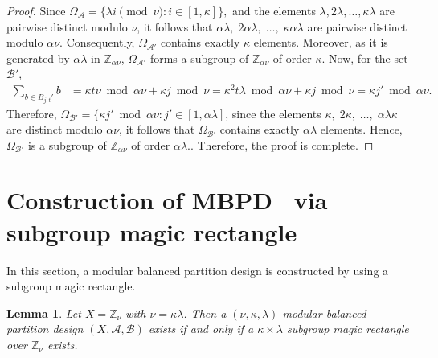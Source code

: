 \documentclass[preprint,11pt]{elsarticle}
\newcommand{\MBPD}{\textnormal{MBPD}}
\newtheorem{lemma}[theorem]{Lemma}
\begin{document}
\begin{proof}
\)
Since
\(
\Omega_{\mathcal{A}}
=
\{\lambda i \pmod{\nu}: i\in[1,\kappa]\},
\)
and the elements \(\lambda,2\lambda,\ldots,\kappa\lambda\) are pairwise distinct modulo \(\nu\), it follows that
\(
\alpha\lambda,\;2\alpha\lambda,\;\ldots,\;\kappa\alpha\lambda
\)
are pairwise distinct modulo \(\alpha\nu\). Consequently,
\(\Omega_{\mathcal{A}'}\) contains exactly \(\kappa\) elements. Moreover, as it is generated by \(\alpha\lambda\) in \(\mathbb{Z}_{\alpha\nu}\), \(\Omega_{\mathcal{A}'}\) forms a subgroup of \(\mathbb{Z}_{\alpha\nu}\) of order \(\kappa\). Now, for the set $\mathcal{B}',$
\begin{align*}
    \sum_{b\in B_{j,t}'}b& = \kappa t \nu \bmod{\alpha\nu}+\kappa j\bmod{\nu} = \kappa^2t{\lambda} \bmod{\alpha\nu}+\kappa j \bmod{\nu} = \kappa j'\bmod\alpha{\nu}.
\end{align*} Therefore, $\Omega_{\mathcal{B}'}=\{\kappa j'\bmod\alpha{\nu}:j'\in[1, \alpha\lambda]$, since the elements
\(
\kappa,\;2\kappa,\;\ldots,\;\alpha\lambda\kappa
\)
are distinct modulo \(\alpha\nu\), it follows that \(\Omega_{\mathcal{B}'}\) contains exactly \(\alpha\lambda\) elements. Hence, \(\Omega_{\mathcal{B}'}\) is a subgroup of \(\mathbb{Z}_{\alpha\nu}\) of order \(\alpha\lambda\)..  Therefore, the proof is complete. 
\end{proof}

\section{Construction of \MBPD~ via subgroup magic rectangle}
In this section, a modular balanced partition design is constructed by using a subgroup magic rectangle.
\begin{lemma}\label{lemmamain}
Let $X=\mathbb{Z}_\nu$ with $\nu=\kappa\lambda$. 
Then a $(\nu,\kappa,\lambda)$-modular balanced partition design 
$(X,\mathcal{A},\mathcal{B})$ exists if and only if  
a $\kappa\times \lambda$ subgroup magic rectangle over $\mathbb{Z}_\nu$ exists. 
\end{lemma}
\end{document}
